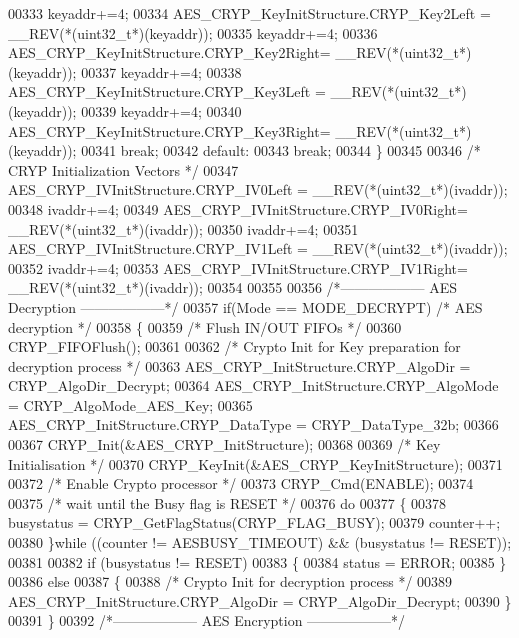 \begin{DoxyCode}
00333     keyaddr+=4;
00334     AES\_CRYP\_KeyInitStructure.CRYP\_Key2Left = \_\_REV(*(uint32\_t*)(keyaddr));
00335     keyaddr+=4;
00336     AES\_CRYP\_KeyInitStructure.CRYP\_Key2Right= \_\_REV(*(uint32\_t*)(keyaddr));
00337     keyaddr+=4;
00338     AES\_CRYP\_KeyInitStructure.CRYP\_Key3Left = \_\_REV(*(uint32\_t*)(keyaddr));
00339     keyaddr+=4;
00340     AES\_CRYP\_KeyInitStructure.CRYP\_Key3Right= \_\_REV(*(uint32\_t*)(keyaddr));
00341     \textcolor{keywordflow}{break};
00342     \textcolor{keywordflow}{default}:
00343     \textcolor{keywordflow}{break};
00344   \}
00345 
00346   \textcolor{comment}{/* CRYP Initialization Vectors */}
00347   AES\_CRYP\_IVInitStructure.CRYP\_IV0Left = \_\_REV(*(uint32\_t*)(ivaddr));
00348   ivaddr+=4;
00349   AES\_CRYP\_IVInitStructure.CRYP\_IV0Right= \_\_REV(*(uint32\_t*)(ivaddr));
00350   ivaddr+=4;
00351   AES\_CRYP\_IVInitStructure.CRYP\_IV1Left = \_\_REV(*(uint32\_t*)(ivaddr));
00352   ivaddr+=4;
00353   AES\_CRYP\_IVInitStructure.CRYP\_IV1Right= \_\_REV(*(uint32\_t*)(ivaddr));
00354 
00355 
00356   \textcolor{comment}{/*------------------ AES Decryption ------------------*/}
00357   \textcolor{keywordflow}{if}(Mode == MODE_DECRYPT) \textcolor{comment}{/* AES decryption */}
00358   \{
00359     \textcolor{comment}{/* Flush IN/OUT FIFOs */}
00360     CRYP_FIFOFlush();
00361 
00362     \textcolor{comment}{/* Crypto Init for Key preparation for decryption process */}
00363     AES\_CRYP\_InitStructure.CRYP_AlgoDir = CRYP_AlgoDir_Decrypt;
00364     AES\_CRYP\_InitStructure.CRYP_AlgoMode = CRYP_AlgoMode_AES_Key;
00365     AES\_CRYP\_InitStructure.CRYP_DataType = CRYP_DataType_32b;
00366 
00367     CRYP_Init(&AES\_CRYP\_InitStructure);
00368 
00369     \textcolor{comment}{/* Key Initialisation */}
00370     CRYP_KeyInit(&AES\_CRYP\_KeyInitStructure);
00371 
00372     \textcolor{comment}{/* Enable Crypto processor */}
00373     CRYP_Cmd(ENABLE);
00374 
00375     \textcolor{comment}{/* wait until the Busy flag is RESET */}
00376     \textcolor{keywordflow}{do}
00377     \{
00378       busystatus = CRYP\_GetFlagStatus(CRYP_FLAG_BUSY);
00379       counter++;
00380     \}\textcolor{keywordflow}{while} ((counter != AESBUSY_TIMEOUT) && (busystatus != RESET));
00381 
00382     \textcolor{keywordflow}{if} (busystatus != RESET)
00383    \{
00384        status = ERROR;
00385     \}
00386     \textcolor{keywordflow}{else}
00387     \{
00388       \textcolor{comment}{/* Crypto Init for decryption process */}
00389       AES\_CRYP\_InitStructure.CRYP\_AlgoDir = CRYP_AlgoDir_Decrypt;
00390     \}
00391   \}
00392   \textcolor{comment}{/*------------------ AES Encryption ------------------*/}

\end{DoxyCode}
